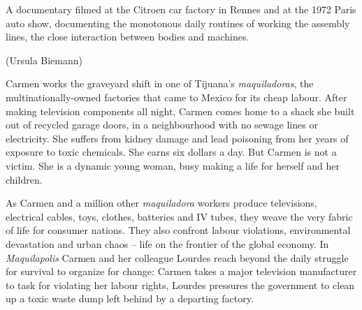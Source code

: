 {{ 


A documentary filmed at the Citroen car factory in Rennes and at the
1972 Paris auto show, documenting the monotonous daily routines of
working the assembly lines, the close interaction between bodies and
machines.



 (Ursula Biemann)
\blank
{}



Carmen works the graveyard shift in one of Tijuana's
{\em maquiladoras}, the multinationally{}-owned factories that came
to Mexico for its cheap labour. After making television components all
night, Carmen comes home to a shack she built out of recycled garage
doors, in a neighbourhood with no sewage lines or electricity. She
suffers from kidney damage and lead poisoning from her years of
exposure to toxic chemicals. She earns six dollars a day. But Carmen is
not a victim. She is a dynamic young woman, busy making a life for
herself and her children.

As Carmen and a million other {\em maquiladora} workers produce
televisions, electrical cables, toys, clothes, batteries and IV tubes,
they weave the very fabric of life for consumer nations. They also
confront labour violations, environmental devastation and urban chaos
{--} life on the frontier of the global economy. In
{\em Maquilapolis} Carmen and her colleague Lourdes reach beyond the
daily struggle for survival to organize for change: Carmen takes a
major television manufacturer to task for violating her labour rights,
Lourdes pressures the government to clean up a toxic waste dump left
behind by a departing factory. 

}}
